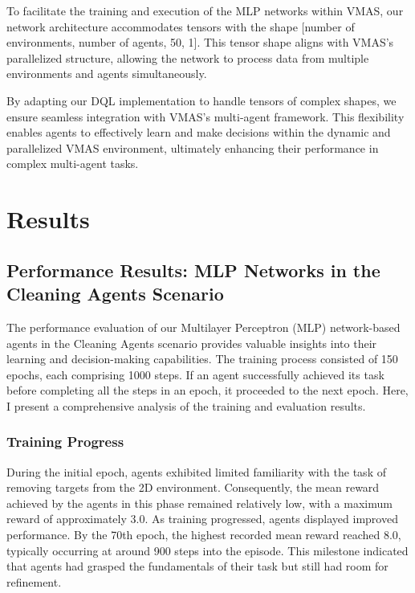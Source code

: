 \documentclass{scrartcl}
\begin{document}
To facilitate the training and execution of the MLP networks within VMAS, our network architecture accommodates tensors with the shape [number of environments, number of agents, 50, 1]. This tensor shape aligns with VMAS's parallelized structure, allowing the network to process data from multiple environments and agents simultaneously.

By adapting our DQL implementation to handle tensors of complex shapes, we ensure seamless integration with VMAS's multi-agent framework. This flexibility enables agents to effectively learn and make decisions within the dynamic and parallelized VMAS environment, ultimately enhancing their performance in complex multi-agent tasks.

\newpage

\section{Results}
\subsection{Performance Results: MLP Networks in the Cleaning Agents Scenario}

The performance evaluation of our Multilayer Perceptron (MLP) network-based agents in the Cleaning Agents scenario provides valuable insights into their learning and decision-making capabilities. The training process consisted of 150 epochs, each comprising 1000 steps. If an agent successfully achieved its task before completing all the steps in an epoch, it proceeded to the next epoch. Here, I present a comprehensive analysis of the training and evaluation results.

\subsubsection{Training Progress}

During the initial epoch, agents exhibited limited familiarity with the task of removing targets from the 2D environment. Consequently, the mean reward achieved by the agents in this phase remained relatively low, with a maximum reward of approximately 3.0. As training progressed, agents displayed improved performance. By the 70th epoch, the highest recorded mean reward reached 8.0, typically occurring at around 900 steps into the episode. This milestone indicated that agents had grasped the fundamentals of their task but still had room for refinement.
\end{document}
